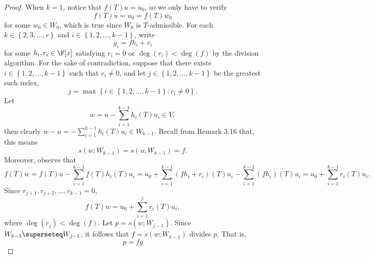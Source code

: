 \documentclass[math_245.tex]{subfiles}
\begin{document}
    \begin{proof}
        When $k=1$, notice that $f(T)u=u_0$, so we only have to verify
        \begin{equation*}
            f(T)u = u_0 = f(T)w_0
        \end{equation*}
        for some $w_0\in W_0$, which is true since $W_0$ is $T$-admissible. For each $k\in \left\lbrace 2,3,\ldots,r \right\rbrace$ and $i\in\left\lbrace 1,2,\ldots,k-1 \right\rbrace$, write
        \begin{equation*}
            g_i = fh_i+r_i
        \end{equation*}
        for some $h_i,r_i\in\F[x]$ satisfying $r_i=0$ or $\deg(r_i)<\deg(f)$ by the division algorithm. For the sake of contradiction, suppose that there exists $i\in \left\lbrace 1,2,\ldots,k-1 \right\rbrace$ such that $r_i\neq 0$, and let $j\in\left\lbrace 1,2,\ldots,k-1 \right\rbrace$ be the greatest such index,
        \begin{equation*}
            j = \max\left\lbrace i\in\left\lbrace 1,2,\ldots,k-1 \right\rbrace :r_i\neq 0 \right\rbrace .
        \end{equation*}
        Let
        \begin{equation*}
            w = u - \sum^{k-1}_{i=1} h_i(T)u_i\in V,
        \end{equation*}
        then clearly $w-u = -\sum^{k-1}_{i=1} h_i(T)u_i\in W_{k-1}$. Recall from Remark 3.16 that, this means
        \begin{equation*}
            s(w;W_{k-1}) = s(u;W_{k-1}) = f.
        \end{equation*}
        Moreover, observe that
        \begin{equation*}
            f(T)w = f(T)u - \sum^{k-1}_{i=1} f(T)h_i(T)u_i = u_0 + \sum^{k-1}_{i=1} \left( fh_i+r_i \right) (T)u_i - \sum^{k-1}_{i=1} \left( fh_i \right) (T)u_i = u_0 + \sum^{k-1}_{i=1} r_i(T)u_i.
        \end{equation*}
        Since $r_{j+1}, r_{j+2}, \ldots, r_{k-1}=0$,
        \begin{equation*}
            f(T)w = u_0 + \sum^{j}_{i=1} r_i(T)u_i,
        \end{equation*}
        where $\deg\left(r_j\right)<\deg(f)$. Let $p=s\left( w;W_{j-1} \right) $. Since $W_{k-1}\superseteq W_{j-1}$, it follows that $f = s\left( w;W_{k-1} \right) $ divides $p$. That is,
        \begin{equation*}
            p = fg
        \end{equation*}

\end{proof}
\end{document}
